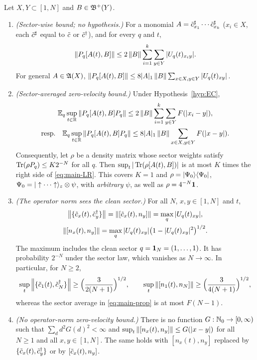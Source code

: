 \begin{proposition}\label{prop:LR}
Let $X,Y\subset[1,N]$ and $B\in\mathfrak{B}^+(Y)$.
\begin{enumerate}[label=(\alph*)]
\item \emph{(Sector-wise bound; no hypothesis.)}  For a monomial $A=\tilde c^{\sharp}_{x_1}\cdots\tilde c^{\sharp}_{x_k}$
($x_i\in X$, each $\tilde c^\sharp$ equal to $\tilde c$ or $\tilde c^\dagger$), and for every $q$ and $t$,
\begin{equation}\label{eq:main-LRsector}
  \left\|P_q[A(t),B]\right\|\le2\left\|B\right\|\sum_{i=1}^k\sum_{y\in Y}|U_q(t)_{x_iy}| .
\end{equation}
For general $A\in\mathfrak{A}(X)$, $\left\|P_q[A(t),B]\right\|\le8|A|_1\left\|B\right\|\sum_{x\in X,y\in Y}|U_q(t)_{xy}|$.
\item \emph{(Sector-averaged zero-velocity bound.)}  Under Hypothesis~\ref{hyp:EC},
\begin{equation}\label{eq:main-LR}
\begin{gathered}
  \mathbb{E}_q\sup_{t\in\mathbb{R}}\left\|P_q[A(t),B]P_q\right\|\le2\left\|B\right\|\sum_{i=1}^k\sum_{y\in Y}F(|x_i-y|),\\
  \text{resp.}\quad\mathbb{E}_q\sup_{t\in\mathbb{R}}\left\|P_q[A(t),B]P_q\right\|\le8|A|_1\left\|B\right\|\sum_{x\in X,y\in Y}F(|x-y|).
\end{gathered}
\end{equation}
Consequently, let $\rho$ be a density matrix whose sector weights satisfy $\operatorname{Tr}(\rho P_q)\le K2^{-N}$ for all
$q$.  Then $\sup_t|\operatorname{Tr}(\rho[A(t),B])|$ is at most $K$ times the right side of \eqref{eq:main-LR}.  This covers $K=1$ and
$\rho=|\Psi_0\rangle\langle \Psi_0|$, $\Psi_0=|\uparrow\cdots\uparrow\rangle_z\otimes\psi$, with \emph{arbitrary} $\psi$, as well
as $\rho=4^{-N}\mathbf{1}$.
\item \emph{(The operator norm sees the clean sector.)}  For all $N$, $x,y\in[1,N]$ and $t$,
\begin{equation}\label{eq:main-LRnorm}
\begin{gathered}
  \left\|\{\tilde c_x(t),\tilde c_y^\dagger\}\right\|=\left\|[\tilde c_x(t),n_y]\right\|=\max_q|U_q(t)_{xy}|,\\
  \left\|[n_x(t),n_y]\right\|=\max_q|U_q(t)_{xy}|\bigl(1-|U_q(t)_{xy}|^2\bigr)^{1/2}.
\end{gathered}
\end{equation}
The maximum includes the clean sector $q=\mathbf{1}_N=(1,\dots,1)$.  It has probability $2^{-N}$ under the sector
law, which vanishes as $N\to\infty$.  In particular, for $N\ge2$,
\[
  \sup_t\left\|\{\tilde c_1(t),\tilde c_N^\dagger\}\right\|\ge\Bigl(\frac{3}{2(N+1)}\Bigr)^{1/2},\qquad
  \sup_t\left\|[n_1(t),n_N]\right\|\ge\Bigl(\frac{3}{4(N+1)}\Bigr)^{1/2},
\]
whereas the sector average in \eqref{eq:main-prop} is at most $F(N-1)$.
\item \emph{(No operator-norm zero-velocity bound.)}  There is no function $G:\mathbb{N}_0\to[0,\infty)$ such that
$\sum_dd^2G(d)^2<\infty$ and $\sup_t\left\|[n_x(t),n_y]\right\|\le G(|x-y|)$ for all $N\ge1$ and all $x,y\in[1,N]$.
The same holds with $[n_x(t),n_y]$ replaced by $\{\tilde c_x(t),\tilde c_y^\dagger\}$ or by $[\tilde c_x(t),n_y]$.
\end{enumerate}
\end{proposition}

